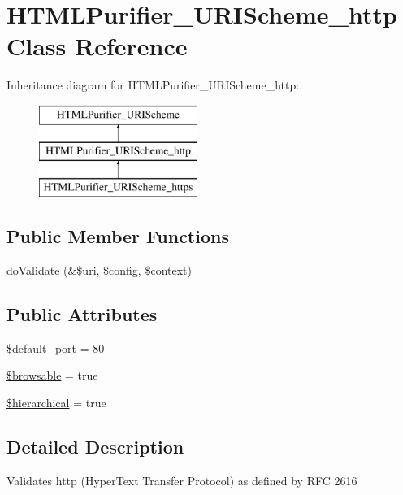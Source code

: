 \hypertarget{classHTMLPurifier__URIScheme__http}{\section{H\+T\+M\+L\+Purifier\+\_\+\+U\+R\+I\+Scheme\+\_\+http Class Reference}
\label{classHTMLPurifier__URIScheme__http}
}
Inheritance diagram for H\+T\+M\+L\+Purifier\+\_\+\+U\+R\+I\+Scheme\+\_\+http\+:\begin{figure}[H]
\begin{center}
\leavevmode
\includegraphics[height=3.000000cm]{classHTMLPurifier__URIScheme__http}
\end{center}
\end{figure}
\subsection*{Public Member Functions}
\begin{DoxyCompactItemize}
\item 
\hyperlink{classHTMLPurifier__URIScheme__http_a554126e05bd10645b814661ec96e00c9}{do\+Validate} (\&\$uri, \$config, \$context)
\end{DoxyCompactItemize}
\subsection*{Public Attributes}
\begin{DoxyCompactItemize}
\item 
\hyperlink{classHTMLPurifier__URIScheme__http_a01a76c2738847d030ef72d3176904df3}{\$default\+\_\+port} = 80
\item 
\hyperlink{classHTMLPurifier__URIScheme__http_a19d530875ba0cccf3b1a5e4dafa3e4c8}{\$browsable} = true
\item 
\hyperlink{classHTMLPurifier__URIScheme__http_af0af83918ca0e98aec3da6954eff982b}{\$hierarchical} = true
\end{DoxyCompactItemize}


\subsection{Detailed Description}
Validates http (Hyper\+Text Transfer Protocol) as defined by R\+F\+C 2616 

